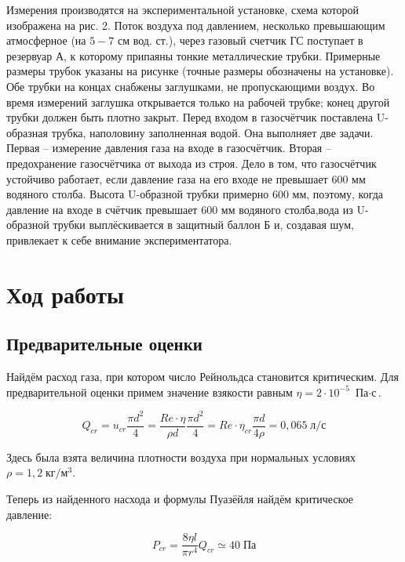 \documentclass[a4paper, 12pt]{article} %
\begin{document}
Измерения производятся на экспериментальной установке, схема которой изображена на рис. 2. Поток воздуха под давлением, несколько превышающим атмосферное (на $5-7$ см вод. ст.), через газовый счетчик ГС поступает в резервуар А, к которому припаяны тонкие металлические трубки. Примерные размеры трубок указаны на рисунке (точные размеры обозначены на установке). Обе трубки на концах снабжены заглушками, не пропускающими воздух. Во время измерений заглушка открывается только на рабочей трубке; конец другой трубки должен быть плотно закрыт. Перед входом в газосчётчик поставлена U-образная трубка, наполовину заполненная водой. Она выполняет две задачи. Первая -- измерение давления газа на входе в газосчётчик. Вторая -- предохранение газосчётчика от выхода из строя. Дело в том, что газосчётчик устойчиво работает, если давление газа на его входе не превышает $600$ мм водяного столба. Высота U-образной трубки примерно $600$ мм, поэтому, когда давление на входе в счётчик превышает $600$ мм водяного столба,вода из U-образной трубки выплёскивается в защитный баллон Б и, создавая шум, привлекает к себе внимание экспериментатора.
 
\section{Ход работы}

\subsection{Предварительные оценки}

Найдём расход газа, при котором число Рейнольдса становится критическим. Для предварительной оценки примем значение взякости равным $\eta = 2 \cdot 10^{-5}$ $\text{Па} \cdot \text{с}$.

\begin{equation}
    Q_{cr} = u_{cr} \frac{\pi d^2}{4} = \frac{Re \cdot \eta}{\rho d} \frac{\pi d^2}{4} = Re \cdot \eta_{cr} \frac{\pi d}{4 \rho } = 0,065 \; \text{л/с}
\end{equation}

Здесь была взята величина плотности воздуха при нормальных условиях $\rho = 1,2 \; \text{кг}/\text{м}^3$.

Теперь из найденного насхода и формулы Пуазёйля найдём критическое давление:

\begin{equation}
    P_{cr} = \frac{8 \eta l}{\pi r^4} Q_{cr} \simeq 40 \; \text{Па}
\end{equation}
\end{document}
